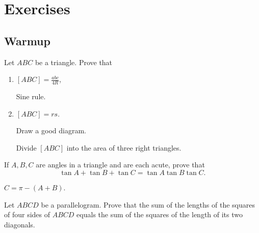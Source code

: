 \documentclass[../jarvis.tex]{subfiles}
\begin{document}
\section{Exercises}
\subsection{Warmup}
\problem Let $ABC$ be a triangle. Prove that 
\begin{enumerate}
    \item $[ABC]=\frac{abc}{4R}$,
    \begin{hints}
        \begin{hint}
            Sine rule.
        \end{hint}
    \end{hints} 
    \item $[ABC]=rs$.
    \begin{hints}
        \begin{hint}
            Draw a good diagram.
        \end{hint}
        \begin{hint}
            Divide $[ABC]$ into the area of three right triangles.
        \end{hint}
    \end{hints}
\end{enumerate}
\problem If $A,B,C$ are angles in a triangle and are each acute, prove that $$\tan{A}+\tan{B}+\tan{C}=\tan{A}\tan{B}\tan{C}.$$
\begin{hints}
    \begin{hint}
        $C=\pi-(A+B)$.
    \end{hint}
\end{hints}

Let $ABCD$ be a parallelogram. Prove that the sum of the lengths of the squares of four sides of $ABCD$ equals the sum of the squares of the length of its two diagonals.
\end{document}
